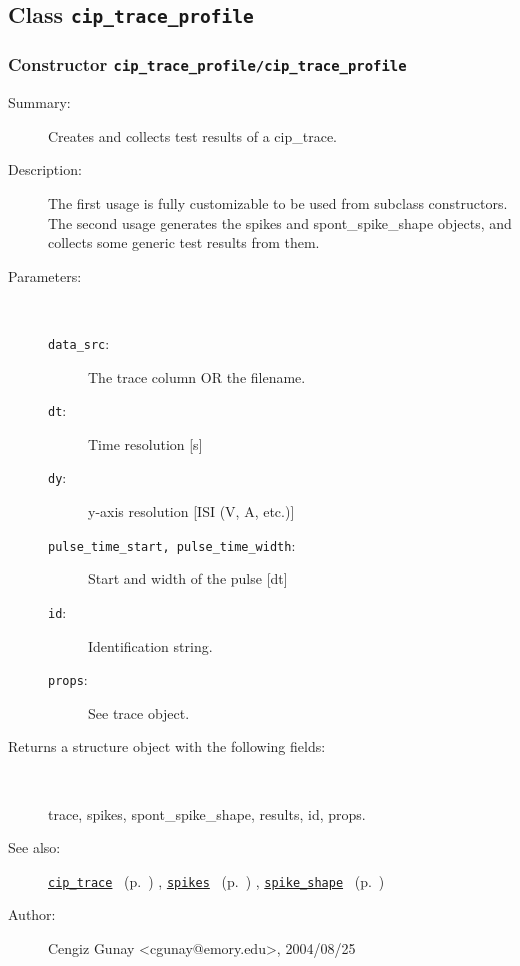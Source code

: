 \subsection{Class \texttt{cip\_trace\_profile}}%
%
\label{ref_cip_trace_profile}%
\hypertarget{ref_cip_trace_profile}{}%
\subsubsection[Constructor \texttt{cip\_trace\_profile}]{Constructor \texttt{cip\_trace\_profile/cip\_trace\_profile}}%
%
\label{ref_cip_trace_profile__cip_trace_profile}%
\hypertarget{ref_cip_trace_profile__cip_trace_profile}{}%
\begin{description}
\item[Summary:]Creates and collects test results of a cip\_trace.
%
%
\item[Description:]%
The first usage is fully customizable to be used from subclass constructors.
 The second usage generates the spikes and spont\_spike\_shape objects, and
 collects some generic test results from them. 
\item[Parameters:]~
\begin{description}%
\item[\texttt{data\_src}:]
 The trace column OR the filename.
\item[\texttt{dt}:]
 Time resolution [s]
\item[\texttt{dy}:]
 y-axis resolution [ISI (V, A, etc.)]
\item[\texttt{pulse\_time\_start, pulse\_time\_width}:]


Start and width of the pulse [dt]
\item[\texttt{id}:]
 Identification string.
\item[\texttt{props}:]
 See trace object.
\end{description}%
%
\item[Returns a structure object with the following fields:
]~

	trace, spikes, spont\_spike\_shape, results, id, props.
%
%
\item[See also:]%
\hyperlink{ref_cip_trace}{\texttt{cip\_trace}}%
\ (p.~\pageref{ref_cip_trace})%
%
, \hyperlink{ref_spikes}{\texttt{spikes}}%
\ (p.~\pageref{ref_spikes})%
%
, \hyperlink{ref_spike_shape}{\texttt{spike\_shape}}%
\ (p.~\pageref{ref_spike_shape})%
%
%
\item[Author:]%
Cengiz Gunay <cgunay@emory.edu>, 2004/08/25
%
\end{description}
\methodline%
